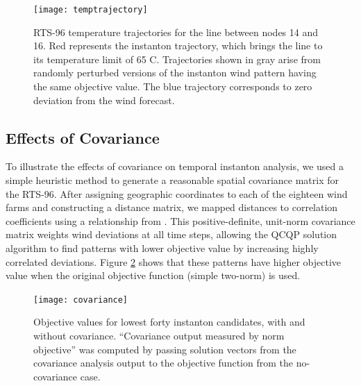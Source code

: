 \documentclass[journal,twoside]{IEEEtran}
\begin{document}
\begin{figure}[!t]
\centering
\texttt{[image: temptrajectory]}
\caption{RTS-96 temperature trajectories for the line between nodes 14 and 16. Red represents the instanton trajectory, which brings the line to its temperature limit of 65 C. Trajectories shown in gray arise from randomly perturbed versions of the instanton wind pattern having the same objective value. The blue trajectory corresponds to zero deviation from the wind forecast.}
\label{fig:temptrajectory}
\end{figure}

\subsection{Effects of Covariance}
To illustrate the effects of covariance on temporal instanton analysis, we used a simple heuristic method to generate a reasonable spatial covariance matrix for the RTS-96. After assigning geographic coordinates to each of the eighteen wind farms and constructing a distance matrix, we mapped distances to correlation coefficients using a relationship from \cite{freris2008}. This positive-definite, unit-norm covariance matrix weights wind deviations at all time steps, allowing the QCQP solution algorithm to find patterns with lower objective value by increasing highly correlated deviations. Figure \ref{fig:covariance} shows that these patterns have higher objective value when the original objective function (simple two-norm) is used.

\begin{figure}[!t]
\centering
\texttt{[image: covariance]}
\caption{Objective values for lowest forty instanton candidates, with and without covariance. ``Covariance output measured by norm objective'' was computed by passing solution vectors from the covariance analysis output to the objective function from the no-covariance case.}
\label{fig:covariance}
\end{figure}
\end{document}
